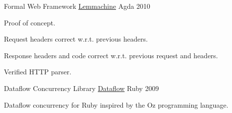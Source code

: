 \begin{cventries}
  \cventry
    {Formal Web Framework} %
    {\href{https://github.com/larrytheliquid/lemmachine}{Lemmachine}} %
    {Agda} %
    {2010} %
    {
      \begin{cvitems} %
        \item {Proof of concept.}
        \item {Request headers correct w.r.t. previous headers.}
        \item {Response headers and code correct w.r.t. previous
          request and headers.}
        \item {Verified HTTP parser.}
      \end{cvitems}
    }
    
  \cventry
    {Dataflow Concurrency Library} %
    {\href{https://github.com/larrytheliquid/dataflow}{Dataflow}} %
    {Ruby} %
    {2009} %
    {
      \begin{cvitems} %
        \item {Dataflow concurrency for Ruby inspired by the Oz
          programming language.}
      \end{cvitems}
    }
\end{cventries}
